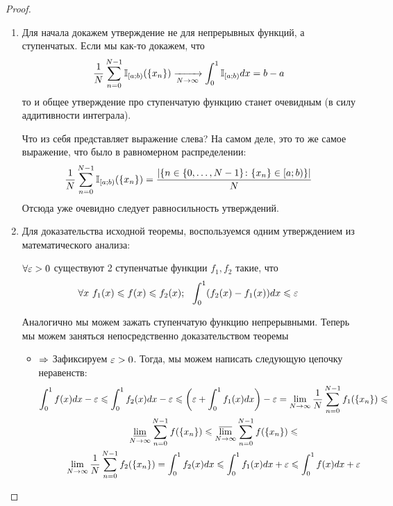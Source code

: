 \begin{proof}
	\begin{enumerate}
		\item Для начала докажем утверждение не для непрерывных функций, а ступенчатых. Если мы как-то докажем, что
		\[
			\frac{1}{N} \sum\limits_{n = 0}^{N - 1} \mathbb{I}_{[a; b)} (\{x_n\}) \xrightarrow[N \to \infty]{} \int_0^1 \mathbb{I}_{[a; b)} dx = b - a
		\]
		то и общее утверждение про ступенчатую функцию станет очевидным (в силу аддитивности интеграла).
		
		Что из себя представляет выражение слева? На самом деле, это то же самое выражение, что было в равномерном распределении:
		\[
			\frac{1}{N} \sum\limits_{n = 0}^{N - 1} \mathbb{I}_{[a; b)} (\{x_n\}) = \frac{|\{n \in \{0, \ldots, N - 1\} \colon \{x_n\} \in [a; b)\}|}{N}
		\]
		Отсюда уже очевидно следует равносильность утверждений.
		
		\item Для доказательства исходной теоремы, воспользуемся одним утверждением из математического анализа:
		\begin{proposition}
			$\forall \varepsilon > 0$ существуют 2 ступенчатые функции $f_1, f_2$ такие, что
			\[
				\forall x \ f_1(x) \leqslant f(x) \leqslant f_2(x); \ \ \int_0^1 (f_2(x) - f_1(x))dx \leqslant \varepsilon
			\]
		\end{proposition}
		Аналогично мы можем зажать ступенчатую функцию непрерывными. Теперь мы можем заняться непосредственно доказательством теоремы
		\begin{itemize}
			\item $\Rightarrow$ Зафиксируем $\varepsilon > 0$. Тогда, мы можем написать следующую цепочку неравенств:
			\begin{multline*}
				\int_0^1 f(x)dx - \varepsilon \leqslant \int_0^1 f_2(x)dx - \varepsilon \leqslant \left(\varepsilon + \int_0^1 f_1(x)dx\right) - \varepsilon = \lim\limits_{N \to \infty} \frac{1}{N} \sum\limits_{n = 0}^{N - 1} f_1(\{x_n\}) \leqslant
				\\
				\varliminf\limits_{N \to \infty} \sum\limits_{n = 0}^{N - 1} f(\{x_n\}) \leqslant \varlimsup\limits_{N \to \infty} \sum\limits_{n = 0}^{N - 1} f(\{x_n\}) \leqslant
				\\
				\lim\limits_{N \to \infty} \frac{1}{N} \sum\limits_{n = 0}^{N - 1} f_2(\{x_n\}) = \int_0^1 f_2(x)dx \leqslant \int_0^1 f_1(x)dx + \varepsilon \leqslant \int_0^1 f(x)dx + \varepsilon
			\end{multline*}
			

\end{itemize}
\end{enumerate}
\end{proof}

